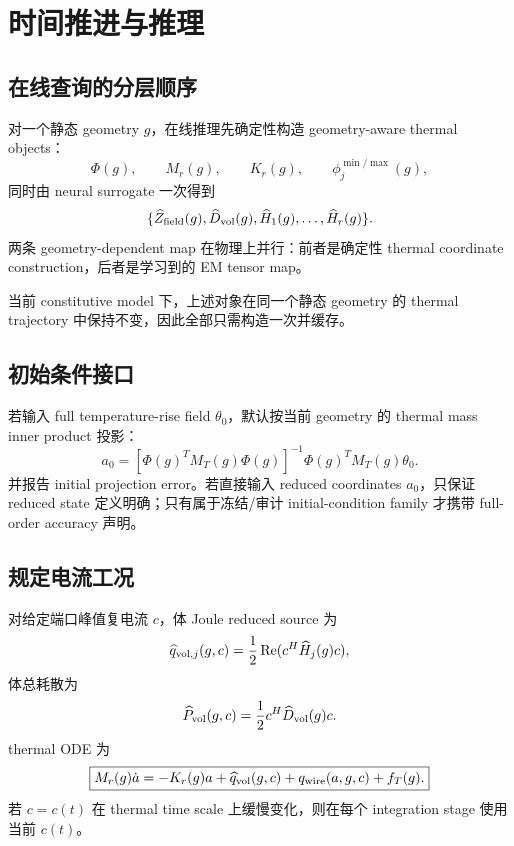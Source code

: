 \section{时间推进与推理}

\subsection{在线查询的分层顺序}
对一个静态 geometry $g$，在线推理先确定性构造 geometry-aware thermal objects：
\begin{equation}
\Phi(g),\qquad M_r(g),\qquad K_r(g),\qquad \phi_j^{\min/\max}(g),
\end{equation}
同时由 neural surrogate 一次得到
\begin{equation}
\{\widehat Z_{\rm field}(g),\widehat D_{\rm vol}(g),\widehat H_1(g),\ldots,\widehat H_r(g)\}.
\end{equation}
两条 geometry-dependent map 在物理上并行：前者是确定性 thermal coordinate construction，后者是学习到的 EM tensor map。

当前 constitutive model 下，上述对象在同一个静态 geometry 的 thermal trajectory 中保持不变，因此全部只需构造一次并缓存。

\subsection{初始条件接口}
若输入 full temperature-rise field $\theta_0$，默认按当前 geometry 的 thermal mass inner product 投影：
\begin{equation}
\boxed{
a_0=[\Phi(g)^TM_T(g)\Phi(g)]^{-1}\Phi(g)^TM_T(g)\theta_0.}
\end{equation}
并报告 initial projection error。若直接输入 reduced coordinates $a_0$，只保证 reduced state 定义明确；只有属于冻结/审计 initial-condition family 才携带 full-order accuracy 声明。

\subsection{规定电流工况}
对给定端口峰值复电流 $c$，体 Joule reduced source 为
\begin{equation}
\widehat q_{{\rm vol},j}(g,c)
=\frac12\operatorname{Re}(c^H\widehat H_j(g)c),
\end{equation}
体总耗散为
\begin{equation}
\widehat P_{\rm vol}(g,c)=\frac12c^H\widehat D_{\rm vol}(g)c.
\end{equation}
thermal ODE 为
\begin{equation}
\boxed{
M_r(g)\dot a
=-K_r(g)a
+\widehat q_{\rm vol}(g,c)
+q_{\rm wire}(a,g,c)+f_T(g).
}
\end{equation}
若 $c=c(t)$ 在 thermal time scale 上缓慢变化，则在每个 integration stage 使用当前 $c(t)$。

